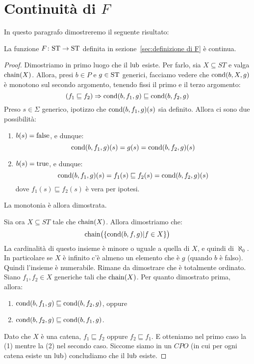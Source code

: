 \section{Continuità di $F$}
In questo paragrafo dimostreremo il seguente risultato:

\begin{teorema}
La funzione $\mathord{F}\colon\mathrm{ST}\to\mathrm{ST}$ definita in sezione~\textup{\ref{sec:definizione di F}} è continua.
\end{teorema}

\begin{proof}
Dimostriamo in primo luogo che il $\mathop{\mathrm{lub}}\nolimits$ esiste.
Per farlo, sia $ X \subseteq ST$ e valga $\mathop{\mathrm{chain}}\nolimits(X)$.
Allora, presi $b \in P$ e $g \in \mathrm{ST}$ generici,
facciamo vedere che $ \mathrm{cond}(b,X,g) $ è monotono sul
secondo argomento, tenendo fissi il primo e il terzo argomento:
\[
  (f_1 \sqsubseteq f_2) \Rightarrow \mathrm{cond}(b,f_{1},g) \sqsubseteq \mathrm{cond}(b,f_{2},g)
\]
Preso $s \in \Sigma $ generico, ipotizzo che $\mathrm{cond}(b,f_1,g)(s)$
sia definito. Allora ci sono due possibilità:
\begin{enumerate}
  \item $b(s) = \mathrm{false}$, e dunque:
        \[ \mathrm{cond}(b,f_1,g)(s)=g(s)=\mathrm{cond}(b,f_2,g)(s) \]
  \item $ b(s) = \mathrm{true} $, e dunque:
        \[
          \mathrm{cond}(b,f_1,g)(s) = f_{1}(s)
          \sqsubseteq f_{2}(s) = \mathrm{cond}(b,f_2,g)(s)
        \]
        dove $f_{1}(s) \sqsubseteq f_{2}(s)$ è vera per ipotesi.
\end{enumerate}
La monotonia è allora dimostrata.

Sia ora $ X \subseteq ST$ tale che $\mathop{\mathrm{chain}}\nolimits(X) $. Allora dimostriamo che:
\[
  \mathop{\mathrm{chain}}\nolimits\bigl( \{\mathrm{cond}(b,f,g) | f \in X\}\bigr)
\]
La cardinalità di questo insieme è minore o uguale
a quella di $X$, e quindi di $\aleph_0$.
In particolare se $X$ è infinito c'è almeno un elemento
che è $g$ (quando $b$ è falso). Quindi l'insieme è numerabile.
Rimane da dimostrare che è totalmente ordinato.
Siano $f_1,f_2 \in X$ generiche tali che $\mathop{\mathrm{chain}}\nolimits(X)$.
Per quanto dimostrato prima, allora:
\begin{enumerate}
  \item $\mathrm{cond}(b,f_1,g) \sqsubseteq \mathrm{cond}(b,f_2,g)$, oppure
  \item $\mathrm{cond}(b,f_2,g) \sqsubseteq \mathrm{cond}(b,f_1,g)$.
\end{enumerate}
Dato che $X$ è una catena, $f_1 \sqsubseteq f_2$ oppure
$f_2 \sqsubseteq f_1 $. E otteniamo nel primo caso la (1)
mentre la (2) nel secondo caso.
Siccome siamo in un $CPO$ (in cui per ogni catena esiste
un $\mathop{\mathrm{lub}}\nolimits$) concludiamo che il $\mathop{\mathrm{lub}}\nolimits$ esiste.


\end{proof}
